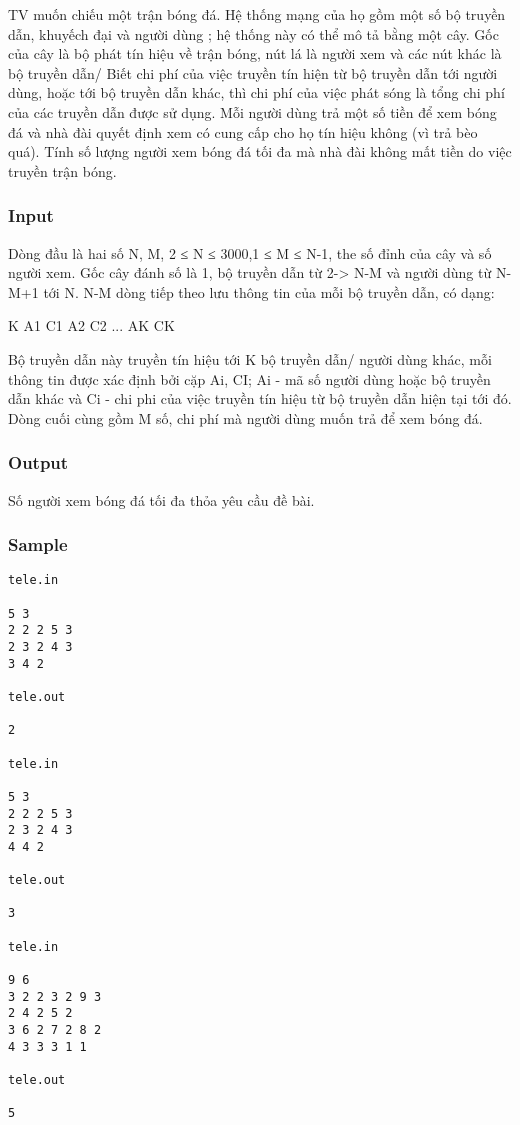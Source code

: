 



   TV muốn chiếu một trận bóng đá. Hệ thống mạng của họ gồm một số bộ  truyền dẫn, khuyếch đại và người dùng ; hệ thống này có thể mô tả bằng  một cây.    Gốc của cây là bộ phát tín hiệu về trận bóng, nút lá là người xem và các  nút khác là bộ truyền dẫn/ Biết chi phí của việc truyền tín hiện từ bộ truyền dẫn tới người dùng,  hoặc tới bộ truyền dẫn khác, thì chi phí của việc phát sóng là tổng chi phí  của các truyền dẫn được sử dụng. Mỗi người dùng trả một số tiền để xem bóng đá và nhà đài quyết định xem có  cung cấp cho họ tín hiệu không (vì trả bèo quá). Tính số lượng người xem bóng đá tối đa mà nhà đài không mất tiền do  việc truyền trận bóng.  

\subsubsection{   Input  }

   Dòng đầu là hai số N, M, 2 ≤ N ≤ 3000,1 ≤ M ≤ N-1, the số đỉnh của cây  và số người xem. Gốc cây đánh số là 1, bộ truyền dẫn từ 2-> N-M và người dùng từ N-M+1 tới N.  N-M dòng tiếp theo lưu thông tin của mỗi bộ truyền dẫn, có dạng:  

   K A1 C1 A2 C2 ... AK CK  

   Bộ truyền dẫn này truyền tín hiệu tới K bộ truyền dẫn/ người dùng khác,  mỗi thông tin được xác định bởi cặp Ai, CI; Ai - mã số người dùng hoặc  bộ truyền dẫn khác và Ci - chi phi của việc truyền tín hiệu từ bộ truyền  dẫn hiện tại tới đó. Dòng cuối cùng gồm M số, chi phí mà người dùng muốn trả để xem bóng đá.  

\subsubsection{   Output  }

   Số người xem bóng đá tối đa thỏa yêu cầu đề bài.  

\subsubsection{   Sample  }
\begin{verbatim}
tele.in 
 
5 3 
2 2 2 5 3 
2 3 2 4 3 
3 4 2 
 
tele.out 
 
2 

tele.in 
 
5 3 
2 2 2 5 3 
2 3 2 4 3 
4 4 2 
 
tele.out 
 
3 

tele.in 
 
9 6 
3 2 2 3 2 9 3 
2 4 2 5 2 
3 6 2 7 2 8 2 
4 3 3 3 1 1 
 
tele.out 
 
5
\end{verbatim}
